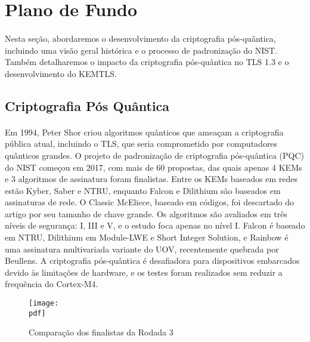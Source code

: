 \documentclass[letterpaper,11pt,leqno]{article}
\newcommand{\pdf}{figures/figures}
\begin{document}
\section{Plano de Fundo}

\paragraph{}
Nesta seção, abordaremos o desenvolvimento da criptografia pós-quântica,
incluindo uma visão geral histórica e o processo de padronização do NIST. Também
detalharemos o impacto da criptografia pós-quântica no TLS 1.3 e o
desenvolvimento do KEMTLS.

\subsection{Criptografia Pós Quântica}

\paragraph{}
Em 1994, Peter Shor criou algoritmos quânticos que ameaçam a criptografia
pública atual, incluindo o TLS, que seria comprometido por computadores
quânticos grandes. O projeto de padronização de criptografia pós-quântica (PQC)
do NIST começou em 2017, com mais de 60 propostas, das quais apenas 4 KEMs e 3
algoritmos de assinatura foram finalistas. Entre os KEMs baseados em redes estão
Kyber, Saber e NTRU, enquanto Falcon e Dilithium são baseados em assinaturas de
rede. O Classic McEliece, baseado em códigos, foi descartado do artigo por seu
tamanho de chave grande. Os algoritmos são avaliados em três níveis de
segurança: I, III e V, e o estudo foca apenas no nível I. Falcon é baseado em
NTRU, Dilithium em Module-LWE e Short Integer Solution, e Rainbow é uma
assinatura multivariada variante do UOV, recentemente quebrada por Beullens. A
criptografia pós-quântica é desafiadora para dispositivos embarcados devido às
limitações de hardware, e os testes foram realizados sem reduzir a frequência do
Cortex-M4.

\begin{figure}[H]
	{\texttt{[image: \\pdf]}}
	\caption{Comparação dos finalistas da Rodada 3}
	\label{f:table1}\end{figure}
\end{document}
